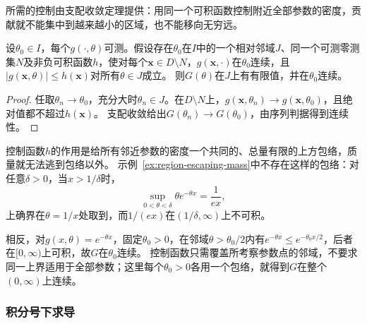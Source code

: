 所需的控制由支配收敛定理提供：用同一个可积函数控制附近全部参数的密度，贡献就不能集中到越来越小的区域，也不能移向无穷远。
\begin{theorem}[可积控制下参数积分的连续性]
设$\theta_0\in I$，每个$g(\cdot,\theta)$可测。假设存在$\theta_0$在$I$中的一个相对邻域$J$、同一个可测零测集$N$及非负可积函数$h$，使对每个$\bm x\in D\setminus N$，$g(\bm x,\cdot)$在$\theta_0$连续，且
$|g(\bm x,\theta)|\leq h(\bm x)$对所有$\theta\in J$成立。
则$G(\theta)$在$J$上有有限值，并在$\theta_0$连续。
\end{theorem}
\begin{proof}
任取$\theta_n\to\theta_0$，充分大时$\theta_n\in J$。在$D\setminus N$上，$g(\bm x,\theta_n)\to g(\bm x,\theta_0)$，且绝对值都不超过$h(\bm x)$。
支配收敛给出$G(\theta_n)\to G(\theta_0)$，由序列判据得到连续性。
\end{proof}

控制函数$h$的作用是给所有邻近参数的密度一个共同的、总量有限的上方包络，质量就无法逃到包络以外。
示例~\ref{ex:region-escaping-mass}中不存在这样的包络：对任意$\delta>0$，当$x>1/\delta$时，
\[
 \sup_{0<\theta<\delta}\theta e^{-\theta x}=\frac{1}{ex},
\]
上确界在$\theta=1/x$处取到，而$1/(ex)$在$(1/\delta,\infty)$上不可积。

相反，对$g(x,\theta)=e^{-\theta x}$，固定$\theta_0>0$，在邻域$\theta>\theta_0/2$内有$e^{-\theta x}\leq e^{-\theta_0x/2}$，后者在$[0,\infty)$上可积，故$G$在$\theta_0$连续。
控制函数只需覆盖所考察参数点的邻域，不要求同一上界适用于全部参数；这里每个$\theta_0>0$各用一个包络，就得到$G$在整个$(0,\infty)$上连续。

\subsubsection{积分号下求导}

